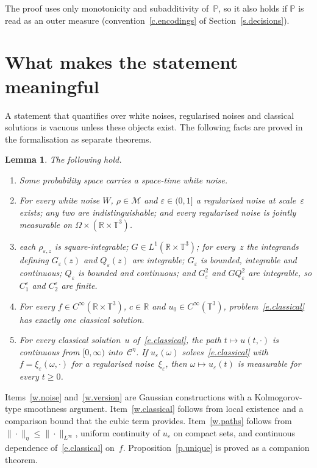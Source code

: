 \documentclass[11pt,letterpaper]{article}
\numberwithin{equation}{section}
\theoremstyle{plain}
\newtheorem{lemma}[proposition]{Lemma}
\theoremstyle{definition}
\theoremstyle{remark}
\newcommand{\R}{\mathbb{R}}
\newcommand{\T}{\mathbb{T}^3}
\newcommand{\Prob}{\mathbb{P}}
\newcommand{\Mol}{\mathcal{M}}
\newcommand{\Cs}{\mathcal{C}}
\newcommand{\1}{\mathbf{1}}
\begin{document}
The proof uses only monotonicity and subadditivity of~$\Prob$, so it also holds if $\Prob$ is read as an outer measure (convention~\ref{c.encodings} of Section~\ref{s.decisions}).

\section{What makes the statement meaningful}
\label{s.meaning}

A statement that quantifies over white noises, regularised noises and classical solutions is vacuous unless these objects exist. The following facts are proved in the formalisation as separate theorems.

\begin{lemma}
\label{l.meaning}
The following hold.
\begin{enumerate}[label=\textup{(W\arabic*)}]
\item \label{w.noise} Some probability space carries a space-time white noise.
\item \label{w.version} For every white noise $W$, $\rho\in\Mol$ and $\varepsilon\in(0,1]$ a regularised noise at scale~$\varepsilon$ exists; any two are indistinguishable; and every regularised noise is jointly measurable on $\Omega\times(\R\times\T)$.
\item \label{w.constants} each $\rho_{\varepsilon,z}$ is square-integrable; $G\in L^1(\R\times\T)$; for every~$z$ the integrands defining $G_\varepsilon(z)$ and $Q_\varepsilon(z)$ are integrable; $G_\varepsilon$ is bounded, integrable and continuous; $Q_\varepsilon$ is bounded and continuous; and $G_\varepsilon^2$ and $GQ_\varepsilon^2$ are integrable, so $C_1^\varepsilon$ and $C_2^\varepsilon$ are finite.
\item \label{w.classical} For every $f\in C^\infty(\R\times\T)$, $c\in\R$ and $u_0\in C^\infty(\T)$, problem~\eqref{e.classical} has exactly one classical solution.
\item \label{w.paths} For every classical solution~$u$ of~\eqref{e.classical}, the path $t\mapsto u(t,\cdot)$ is continuous from $[0,\infty)$ into~$\Cs^\eta$. If $u_\varepsilon(\omega)$ solves~\eqref{e.classical} with $f=\xi_\varepsilon(\omega,\cdot)$ for a regularised noise~$\xi_\varepsilon$, then $\omega\mapsto u_\varepsilon(t)$ is measurable for every $t\ge0$.
\end{enumerate}
\end{lemma}

Items~\ref{w.noise} and~\ref{w.version} are Gaussian constructions with a Kolmogorov-type smoothness argument. Item~\ref{w.classical} follows from local existence and a comparison bound that the cubic term provides. Item~\ref{w.paths} follows from $\|\cdot\|_\eta\le\|\cdot\|_{L^\infty}$, uniform continuity of $u_\varepsilon$ on compact sets, and continuous dependence of~\eqref{e.classical} on~$f$. Proposition~\ref{p.unique} is proved as a companion theorem.
\end{document}
